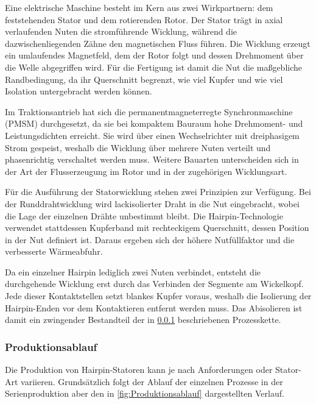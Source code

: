 Eine elektrische Maschine besteht im Kern aus zwei Wirkpartnern: dem feststehenden
Stator und dem rotierenden Rotor. Der Stator trägt in axial verlaufenden Nuten die
stromführende Wicklung, während die dazwischenliegenden Zähne den magnetischen Fluss
führen. Die Wicklung erzeugt ein umlaufendes Magnetfeld, dem der Rotor folgt und
dessen Drehmoment über die Welle abgegriffen wird. Für die Fertigung ist damit die
Nut die maßgebliche Randbedingung, da ihr Querschnitt begrenzt, wie viel Kupfer und
wie viel Isolation untergebracht werden können.

Im Traktionsantrieb hat sich die permanentmagneterregte Synchronmaschine (PMSM)
durchgesetzt, da sie bei kompaktem Bauraum hohe Drehmoment- und Leistungsdichten
erreicht. Sie wird über einen Wechselrichter mit
dreiphasigem Strom gespeist, weshalb die Wicklung über mehrere Nuten verteilt und
phasenrichtig verschaltet werden muss. Weitere Bauarten unterscheiden sich in der
Art der Flusserzeugung im Rotor und in der zugehörigen Wicklungsart.

Für die Ausführung der Statorwicklung stehen zwei Prinzipien zur Verfügung. Bei der
Runddrahtwicklung wird lackisolierter Draht in die Nut eingebracht, wobei die Lage
der einzelnen Drähte unbestimmt bleibt. Die Hairpin-Technologie verwendet stattdessen
Kupferband mit rechteckigem Querschnitt, dessen Position in der Nut definiert ist.
Daraus ergeben sich der höhere Nutfüllfaktor und die verbesserte Wärmeabfuhr.

Da ein einzelner Hairpin lediglich zwei Nuten verbindet, entsteht die durchgehende
Wicklung erst durch das Verbinden der Segmente am Wickelkopf. Jede dieser
Kontaktstellen setzt blankes Kupfer voraus, weshalb die Isolierung der
Hairpin-Enden vor dem Kontaktieren entfernt werden muss. Das Abisolieren ist damit
ein zwingender Bestandteil der in \cref{sec:ProduktionsablaufHairPin}
beschriebenen Prozesskette.
%
\subsubsection{Produktionsablauf}\label{sec:ProduktionsablaufHairPin}
Die Produktion von Hairpin-Statoren kann je nach Anforderungen oder Stator-Art variieren.
Grundsätzlich folgt der Ablauf der einzelnen Prozesse in der Serienproduktion aber den in \cref{fig:Produktionsablauf} dargestellten Verlauf.

\newcommand{\nr}[1]{%
  \tikz[baseline=(n.base)]{\node[circle,fill=figAkzent,text=white,
    font=\sffamily\bfseries\tiny,inner sep=0.6pt,minimum size=3.3mm] (n) {#1};}}

